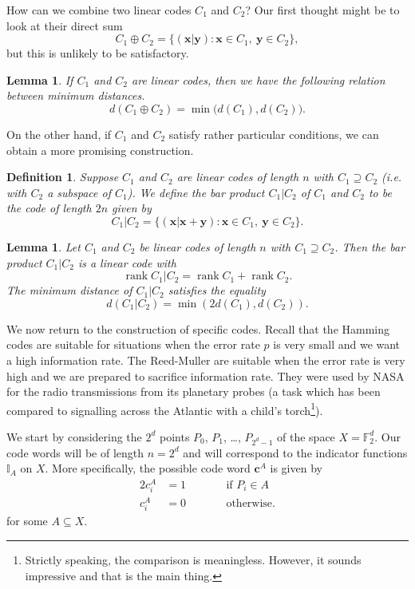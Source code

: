 \documentclass[12pt,a4paper]{article}
\theoremstyle{plain}
\newtheorem{lemma}[theorem]{Lemma}
\newtheorem{definition}[theorem]{Definition}
\theoremstyle{definition}
\newcommand{\rank}{\operatorname{rank}}
\begin{document}
    How can we combine two linear codes $C_{1}$ and $C_{2}$?
    Our first thought might be to look at their
    direct sum
    \[C_{1}\oplus C_{2}=\{({\mathbf x}|{\mathbf y})
    :{\mathbf x}\in C_{1},\ {\mathbf y}\in C_{2}\},\]
    but this is unlikely to be satisfactory.
    \begin{lemma}
        If $C_{1}$ and $C_{2}$ are linear codes,
        then we have the following relation between
        minimum distances.
        \[d(C_{1}\oplus C_{2})=\min\big(d(C_{1}),d(C_{2})\big).\]
    \end{lemma}
    On the other hand, if $C_{1}$ and $C_{2}$ satisfy
    rather particular conditions, we can obtain
    a more promising construction.
    \begin{definition}
        Suppose $C_{1}$ and $C_{2}$
        are linear codes of length $n$
        with $C_{1}\supseteq C_{2}$
        (i.e. with $C_{2}$ a subspace of $C_{1}$). We define
        the \emph{bar product} $C_{1}|C_{2}$ of $C_{1}$
        and $C_{2}$ to be the code of length $2n$ given by
        \[C_{1}|C_{2}=\{({\mathbf x}|{\mathbf x}+{\mathbf y})
        :{\mathbf x}\in C_{1},\ {\mathbf y}\in C_{2}\}.\]
    \end{definition}
    \begin{lemma}
        Let $C_{1}$ and $C_{2}$
        be linear codes of length $n$
        with $C_{1}\supseteq C_{2}$. Then
        the bar product $C_{1}|C_{2}$
        is a linear code with
        \[\rank C_{1}|C_{2}=\rank C_{1}+\rank C_{2}.\]
        The minimum distance of $C_{1}|C_{2}$ satisfies
        the equality
        \[d(C_{1}|C_{2})=\min(2d(C_{1}),d(C_{2})).\]
    \end{lemma}
    We now return to the construction of specific codes.
    Recall that the Hamming codes are suitable for situations
    when the error rate $p$ is very small and we want
    a high information rate. The Reed-Muller are suitable
    when the error rate is very high and we are prepared
    to sacrifice information rate. They were used by NASA
    for the radio transmissions from its planetary probes
    (a task which has been compared
    to signalling across
    the Atlantic with a child's torch\footnote{Strictly
    speaking, the comparison is meaningless. However,
    it sounds impressive and that is the main thing.}).

    We start by considering the $2^{d}$ points $P_{0}$, $P_{1}$,
    \dots, $P_{2^{d}-1}$ of the space
    $X={\mathbb F}_{2}^{d}$. Our code
    words will be of length $n=2^{d}$ and will
    correspond to the indicator functions
    ${\mathbb I}_{A}$ on $X$. More specifically,
    the possible code word ${\mathbf c}^{A}$ is given
    by
    \begin{alignat*}{2}
        c_{i}^{A}&=1&&\qquad\text{if $P_{i}\in A$}\\
        c_{i}^{A}&=0&&\qquad\text{otherwise}.
    \end{alignat*}
    for some $A\subseteq X$.
\end{document}
